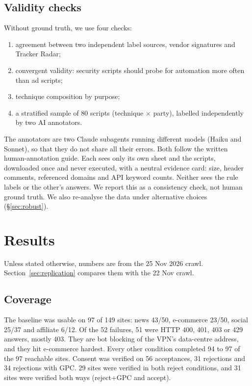 \documentclass[sigconf,review,anonymous]{acmart}
\begin{document}
\subsection{Validity checks}
Without ground truth, we use four checks:
\begin{enumerate}
\item agreement between two independent label sources, vendor signatures and Tracker Radar;
\item convergent validity: security scripts should probe for automation more often than ad scripts;
\item technique composition by purpose;
\item a stratified sample of 80 scripts (technique $\times$ party), labelled independently by
  two AI annotators.
\end{enumerate}
The annotators are two Claude subagents running different models (Haiku and Sonnet), so that
they do not share all their errors. Both follow the written human-annotation guide. Each sees only
its own sheet and the scripts, downloaded once and never executed, with a neutral evidence card:
size, header comments, referenced domains and API keyword counts. Neither sees the rule labels or
the other's answers. We report this as a consistency check, not human ground truth.
We also re-analyse the data under alternative choices (\S\ref{sec:robust}).

\section{Results}\label{sec:results}
Unless stated otherwise, numbers are from the 25 Nov 2026 crawl. Section~\ref{sec:replication}
compares them with the 22 Nov crawl.

\subsection{Coverage}
The baseline was usable on 97 of 149 sites: news 43/50, e-commerce 23/50, social 25/37 and
affiliate 6/12. Of the 52 failures, 51 were HTTP 400, 401, 403 or 429 answers, mostly 403. They
are bot blocking of the VPN's data-centre address, and they hit e-commerce hardest. Every other
condition completed 94 to 97 of the 97 reachable sites. Consent was verified on 56 acceptances,
31 rejections and 34 rejections with GPC. 29 sites were verified in both reject conditions, and
31 sites were verified both ways (reject+GPC and accept).
\end{document}

